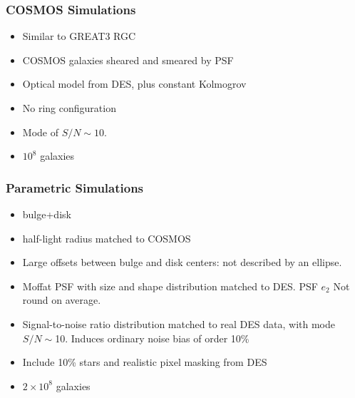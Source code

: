 \documentclass{beamer}
\begin{document}
\frame
{
    \frametitle{COSMOS Simulations}

 
    \begin{itemize}
        \item Similar to {\color{gold} GREAT3 RGC}

        \item COSMOS galaxies sheared and smeared by PSF

        \item Optical model from DES, plus constant Kolmogrov
        \item {\color{gold} No ring} configuration
        \item Mode of {\color{gold} $S/N \sim 10$}.
        \item $10^8$ galaxies
    \end{itemize}

}
\frame
{
    \frametitle{Parametric Simulations}

 
    \begin{itemize}

        \item {\color{gold} bulge+disk}

        \item half-light radius matched to COSMOS

        \item Large offsets between bulge and disk centers:
            {\color{gold} not described by an ellipse}.

        \item Moffat PSF with size and shape distribution
            matched to DES.  PSF $e_2$ Not round on average.

        \item Signal-to-noise ratio distribution matched to real DES
            data, with {\color{gold} mode $S/N \sim$10}.  Induces ordinary noise
            bias of order 10\%
        
        \item Include 10\% {\color{gold} stars} and realistic pixel
            {\color{gold} masking} from DES

        \item $2 \times 10^8$ galaxies


    \end{itemize}

}
\end{document}
